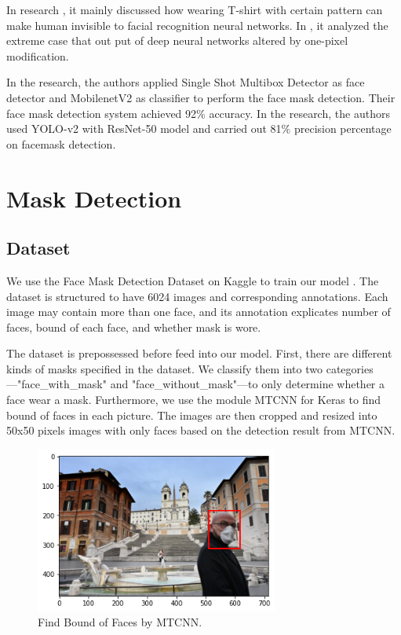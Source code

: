 \documentclass{article}
\begin{document}
In research \cite{tshirt}, it mainly discussed how wearing T-shirt with certain pattern can make human invisible to facial recognition neural networks. In \cite{onepixel}, it analyzed the extreme case that  out put of deep neural networks altered by one-pixel modification.

In the research\cite{facemaskdetect}, the authors applied Single Shot Multibox Detector as face detector and MobilenetV2 as classifier to perform the face mask detection. Their face mask detection system achieved 92\% accuracy.  In the research\cite{Yolo-v2}, the authors used YOLO-v2 with ResNet-50 model and carried out 81\% precision percentage on facemask detection.



\section{Mask Detection}
\subsection{Dataset}
We use the Face Mask Detection Dataset on Kaggle to train our model \cite{kaggle}. The dataset is structured to have 6024 images and corresponding annotations. Each image may contain more than one face, and its annotation explicates number of faces, bound of each face, and whether mask is wore. 


The dataset is prepossessed before feed into our model. First, there are different kinds of masks specified in the dataset. We classify them into two categories—"face\_with\_mask" and "face\_without\_mask"—to only determine whether a face wear a mask. Furthermore, we use the module MTCNN for Keras to find bound of faces in each picture. The images are then cropped and resized into 50x50 pixels images with only faces based on the detection result from MTCNN. 

\begin{figure}[h]
	\centering
    \includegraphics[width=8cm]{download-1.png}
    \caption{Find Bound of Faces by MTCNN.}
\end{figure}
\end{document}
